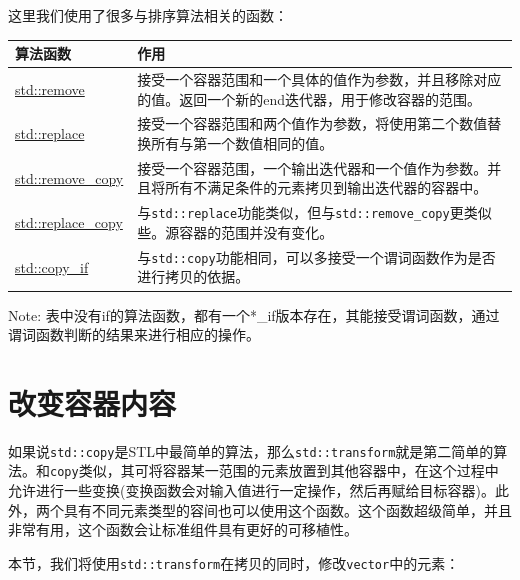 这里我们使用了很多与排序算法相关的函数：

\begin{table}[htbp]\centering
\begin{tabularx}{\textwidth}{lX}
\toprule
算法函数 & 作用 \\
\midrule
\href{https://zh.cppreference.com/w/cpp/algorithm/remove}{std::remove} & 接受一个容器范围和一个具体的值作为参数，并且移除对应的值。返回一个新的end迭代器，用于修改容器的范围。 \\
\href{https://zh.cppreference.com/w/cpp/algorithm/replace}{std::replace} & 接受一个容器范围和两个值作为参数，将使用第二个数值替换所有与第一个数值相同的值。 \\
\href{https://zh.cppreference.com/w/cpp/algorithm/remove_copy}{std::remove\_copy} & 接受一个容器范围，一个输出迭代器和一个值作为参数。并且将所有不满足条件的元素拷贝到输出迭代器的容器中。 \\
\href{https://zh.cppreference.com/w/cpp/algorithm/replace_copy}{std::replace\_copy} & 与\texttt{std::replace}功能类似，但与\texttt{std::remove\_copy}更类似些。源容器的范围并没有变化。 \\
\href{https://zh.cppreference.com/w/cpp/algorithm/copy}{std::copy\_if} & 与\texttt{std::copy}功能相同，可以多接受一个谓词函数作为是否进行拷贝的依据。 \\
\bottomrule
\end{tabularx}
\end{table}

\begin{myInfoBox}
Note: 表中没有if的算法函数，都有一个*\_if版本存在，其能接受谓词函数，通过谓词函数判断的结果来进行相应的操作。
\end{myInfoBox}


\section{改变容器内容}

如果说\texttt{std::copy}是STL中最简单的算法，那么\texttt{std::transform}就是第二简单的算法。和\texttt{copy}类似，其可将容器某一范围的元素放置到其他容器中，在这个过程中允许进行一些变换(变换函数会对输入值进行一定操作，然后再赋给目标容器)。此外，两个具有不同元素类型的容间也可以使用这个函数。这个函数超级简单，并且非常有用，这个函数会让标准组件具有更好的可移植性。


本节，我们将使用\texttt{std::transform}在拷贝的同时，修改\texttt{vector}中的元素：

